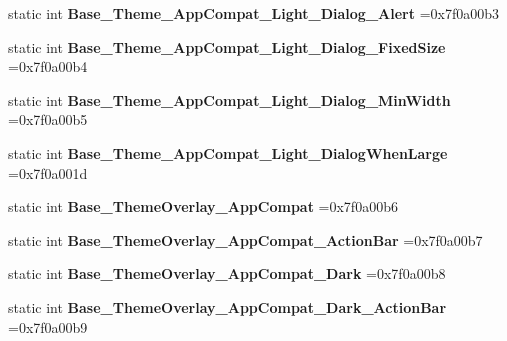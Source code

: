 \begin{DoxyCompactItemize}
static int {\bfseries Base\+\_\+\+Theme\+\_\+\+App\+Compat\+\_\+\+Light\+\_\+\+Dialog\+\_\+\+Alert} =0x7f0a00b3
\item 
\mbox{\label{classandroid_1_1support_1_1design_1_1R_1_1style_af92fdad44ffaf1511256df1039fddfed}} 
static int {\bfseries Base\+\_\+\+Theme\+\_\+\+App\+Compat\+\_\+\+Light\+\_\+\+Dialog\+\_\+\+Fixed\+Size} =0x7f0a00b4
\item 
\mbox{\label{classandroid_1_1support_1_1design_1_1R_1_1style_a06defdd6902725ca5896f64a21e956cf}} 
static int {\bfseries Base\+\_\+\+Theme\+\_\+\+App\+Compat\+\_\+\+Light\+\_\+\+Dialog\+\_\+\+Min\+Width} =0x7f0a00b5
\item 
\mbox{\label{classandroid_1_1support_1_1design_1_1R_1_1style_a0a24bf7cc3d548c78a71da03e81d4d95}} 
static int {\bfseries Base\+\_\+\+Theme\+\_\+\+App\+Compat\+\_\+\+Light\+\_\+\+Dialog\+When\+Large} =0x7f0a001d
\item 
\mbox{\label{classandroid_1_1support_1_1design_1_1R_1_1style_a2f1c00fff94a79fd1499cc873f476b38}} 
static int {\bfseries Base\+\_\+\+Theme\+Overlay\+\_\+\+App\+Compat} =0x7f0a00b6
\item 
\mbox{\label{classandroid_1_1support_1_1design_1_1R_1_1style_ac185a4a60003d5faf3dc43ee8e54e003}} 
static int {\bfseries Base\+\_\+\+Theme\+Overlay\+\_\+\+App\+Compat\+\_\+\+Action\+Bar} =0x7f0a00b7
\item 
\mbox{\label{classandroid_1_1support_1_1design_1_1R_1_1style_a936fc73ee9f9ddd8740e326654098920}} 
static int {\bfseries Base\+\_\+\+Theme\+Overlay\+\_\+\+App\+Compat\+\_\+\+Dark} =0x7f0a00b8
\item 
\mbox{\label{classandroid_1_1support_1_1design_1_1R_1_1style_a96b3734559df63b2607f3ee45cbc442a}} 
static int {\bfseries Base\+\_\+\+Theme\+Overlay\+\_\+\+App\+Compat\+\_\+\+Dark\+\_\+\+Action\+Bar} =0x7f0a00b9
\item 
\mbox{\label{classandroid_1_1support_1_1design_1_1R_1_1style_a9e3286c46eb018b35faf8101f68c7aa8}} 

\end{DoxyCompactItemize}
